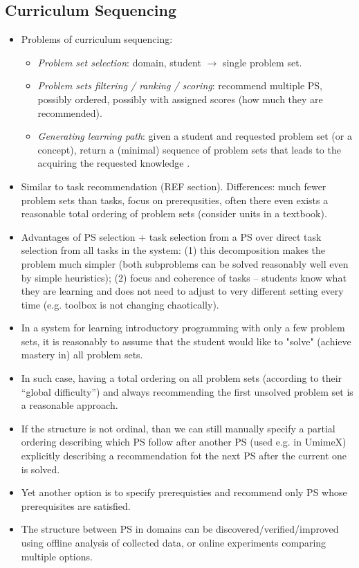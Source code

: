 \subsection{Curriculum Sequencing}

\begin{itemize}
\item Problems of curriculum sequencing:
\begin{itemize}
\item \emph{Problem set selection}: domain, student $\rightarrow$ single problem set.
\item \emph{Problem sets filtering / ranking / scoring}:
  recommend multiple PS, possibly ordered, possibly with assigned scores (how
  much they are recommended).
\item \emph{Generating learning path}: given a student and requested problem set (or a concept),
  return a (minimal) sequence of problem sets that leads to the acquiring the
  requested knowledge \cite{its-programming}.
\end{itemize}

\item Similar to task recommendation (REF section). Differences:
  much fewer problem sets than tasks,
  focus on prerequsities,
  often there even exists a reasonable total ordering of problem sets
  (consider units in a textbook).
\item Advantages of PS selection + task selection from a PS over direct task selection from all tasks in the system:
  (1) this decomposition makes the problem much simpler (both subproblems can be solved reasonably well even by simple heuristics);
  (2) focus and coherence of tasks -- students know what they are learning and does not need to adjust to very different setting every time (e.g. toolbox is not changing chaotically).

\item In a system for learning introductory programming with only a few problem sets,
  it is reasonably to assume that the student would like to "solve" (achieve mastery in)
  all problem sets. %
\item In such case, having a total ordering on all problem sets (according to their
  ``global difficulty'') and always recommending the first unsolved problem set
  is a reasonable approach.
\item If the structure is not ordinal, than we can still manually specify a
partial ordering describing which PS follow after another PS (used e.g. in UmimeX)
explicitly describing a recommendation fot the next PS after the current one is solved.
\item Yet another option is to specify prerequisties and recommend only PS whose
  prerequisites are satisfied.
\item The structure between PS in domains can be discovered/verified/improved using
  offline analysis of collected data, or online experiments comparing multiple options.
\end{itemize}



